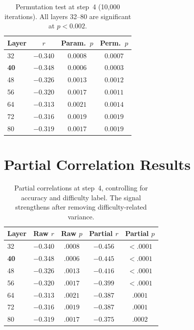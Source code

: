 \documentclass{article}
\begin{document}
\begin{table}[ht]
\caption{Permutation test at step~4 (10{,}000 iterations). All layers 32--80 are significant at $p < 0.002$.}
\label{tab:permutation}
\centering
\small
\begin{tabular}{lccc}
\toprule
Layer & $r$ & Param.\ $p$ & Perm.\ $p$ \\
\midrule
32 & $-0.340$ & $0.0008$ & $0.0007$ \\
\textbf{40} & $\mathbf{-0.348}$ & $\mathbf{0.0006}$ & $\mathbf{0.0003}$ \\
48 & $-0.326$ & $0.0013$ & $0.0012$ \\
56 & $-0.320$ & $0.0017$ & $0.0011$ \\
64 & $-0.313$ & $0.0021$ & $0.0014$ \\
72 & $-0.316$ & $0.0019$ & $0.0019$ \\
80 & $-0.319$ & $0.0017$ & $0.0019$ \\
\bottomrule
\end{tabular}
\end{table}

\section{Partial Correlation Results}
\label{app:partial}

\begin{table}[ht]
\caption{Partial correlations at step~4, controlling for accuracy and difficulty label. The signal strengthens after removing difficulty-related variance.}
\label{tab:partial}
\centering
\small
\begin{tabular}{lcccc}
\toprule
Layer & Raw $r$ & Raw $p$ & Partial $r$ & Partial $p$ \\
\midrule
32 & $-0.340$ & $.0008$ & $-0.456$ & $< .0001$ \\
\textbf{40} & $\mathbf{-0.348}$ & $\mathbf{.0006}$ & $\mathbf{-0.445}$ & $\mathbf{< .0001}$ \\
48 & $-0.326$ & $.0013$ & $-0.416$ & $< .0001$ \\
56 & $-0.320$ & $.0017$ & $-0.399$ & $< .0001$ \\
64 & $-0.313$ & $.0021$ & $-0.387$ & $.0001$ \\
72 & $-0.316$ & $.0019$ & $-0.387$ & $.0001$ \\
80 & $-0.319$ & $.0017$ & $-0.375$ & $.0002$ \\
\bottomrule
\end{tabular}
\end{table}
\end{document}
